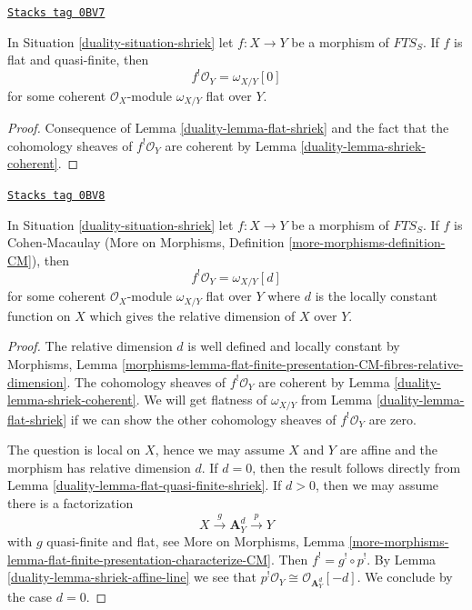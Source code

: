 \begin{lemma}
\label{duality-lemma-flat-quasi-finite-shriek}
\href{https://stacks.math.columbia.edu/tag/0BV7}{\texttt{Stacks tag 0BV7}}

In Situation \ref{duality-situation-shriek} let $f : X \to Y$ be a morphism of
$\textit{FTS}_S$. If $f$ is flat and quasi-finite, then
$$
f^!\mathcal{O}_Y = \omega_{X/Y}[0]
$$
for some coherent $\mathcal{O}_X$-module $\omega_{X/Y}$ flat over $Y$.
\end{lemma}

\begin{proof}

Consequence of Lemma \ref{duality-lemma-flat-shriek} and the fact that the
cohomology sheaves of $f^!\mathcal{O}_Y$ are coherent by
Lemma \ref{duality-lemma-shriek-coherent}.
\end{proof}

\begin{lemma}[CM shriek]
\label{duality-lemma-CM-shriek}
\href{https://stacks.math.columbia.edu/tag/0BV8}{\texttt{Stacks tag 0BV8}}

In Situation \ref{duality-situation-shriek} let $f : X \to Y$ be a morphism of
$\textit{FTS}_S$. If $f$ is Cohen-Macaulay (More on Morphisms, Definition
\ref{more-morphisms-definition-CM}), then
$$
f^!\mathcal{O}_Y = \omega_{X/Y}[d]
$$
for some coherent $\mathcal{O}_X$-module $\omega_{X/Y}$ flat over $Y$
where $d$ is the locally constant
function on $X$ which gives the relative dimension of $X$ over $Y$.
\end{lemma}

\begin{proof}

The relative dimension $d$ is well defined and locally constant by
Morphisms, Lemma
\ref{morphisms-lemma-flat-finite-presentation-CM-fibres-relative-dimension}.
The cohomology sheaves of $f^!\mathcal{O}_Y$ are coherent by
Lemma \ref{duality-lemma-shriek-coherent}.
We will get flatness of $\omega_{X/Y}$ from Lemma \ref{duality-lemma-flat-shriek}
if we can show the other cohomology sheaves of $f^!\mathcal{O}_Y$
are zero.

\medskip\noindent
The question is local on $X$, hence we may assume $X$ and $Y$ are affine
and the morphism has relative dimension $d$. If $d = 0$, then the
result follows directly from Lemma \ref{duality-lemma-flat-quasi-finite-shriek}.
If $d > 0$, then we may assume there is a factorization
$$
X \xrightarrow{g} \mathbf{A}^d_Y \xrightarrow{p} Y
$$
with $g$ quasi-finite and flat, see More on Morphisms, Lemma
\ref{more-morphisms-lemma-flat-finite-presentation-characterize-CM}.
Then $f^! = g^! \circ p^!$. By Lemma \ref{duality-lemma-shriek-affine-line}
we see that $p^!\mathcal{O}_Y \cong \mathcal{O}_{\mathbf{A}^d_Y}[-d]$.
We conclude by the case $d = 0$.
\end{proof}

